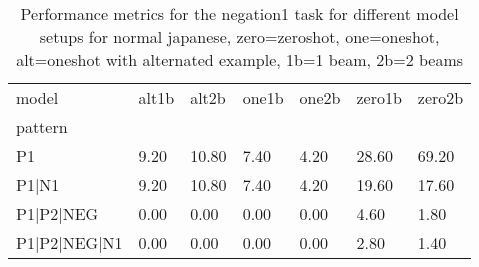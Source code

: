 \begin{table}[h]
\begin{tabular}{l|llllll}
\toprule
model & alt1b & alt2b & one1b & one2b & zero1b & zero2b \\
pattern &  &  &  &  &  &  \\
\midrule
P1 & 9.20 & 10.80 & 7.40 & 4.20 & 28.60 & 69.20 \\
P1|N1 & 9.20 & 10.80 & 7.40 & 4.20 & 19.60 & 17.60 \\
P1|P2|NEG & 0.00 & 0.00 & 0.00 & 0.00 & 4.60 & 1.80 \\
P1|P2|NEG|N1 & 0.00 & 0.00 & 0.00 & 0.00 & 2.80 & 1.40 \\
\bottomrule
\end{tabular}
\caption{Performance metrics for the negation1 task for different model setups for normal japanese, zero=zeroshot, one=oneshot, alt=oneshot with alternated example, 1b=1 beam, 2b=2 beams}
\label{tab:ja norm_negation1_performance}
\end{table}
